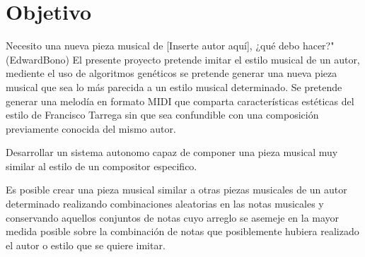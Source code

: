 \section{Objetivo}

Necesito una nueva pieza musical de [Inserte autor aquí], ¿qué debo hacer?" (EdwardBono)
El presente proyecto pretende imitar el estilo musical de un autor, mediente el uso de algoritmos genéticos se pretende generar una nueva pieza musical que sea lo más parecida a un estilo musical determinado.
Se pretende generar una melodía en formato MIDI que comparta características estéticas del estilo de Francisco Tarrega sin que sea confundible con una composición previamente conocida del mismo autor.

Desarrollar un sistema autonomo capaz de componer una pieza musical muy similar al estilo de un compositor especifico.

Es posible crear una pieza musical similar a otras piezas musicales de un autor determinado realizando combinaciones aleatorias en las notas musicales y conservando aquellos conjuntos de notas cuyo arreglo se asemeje en la mayor medida posible sobre la combinación de notas que posiblemente hubiera realizado el autor o estilo que se quiere imitar.

%

%
%
%
